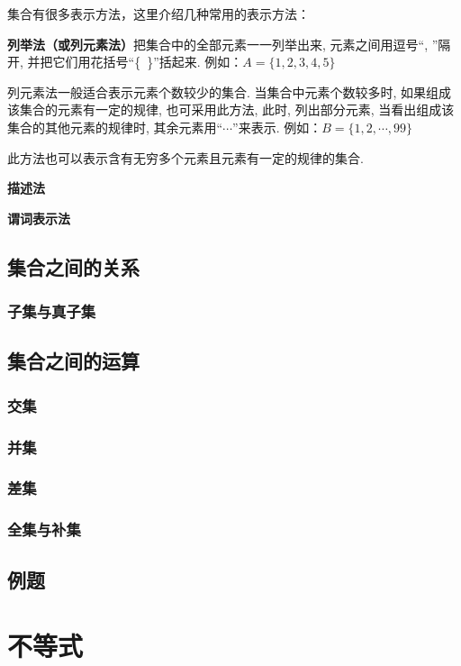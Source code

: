 \documentclass[a5paper]{article}
\begin{document}
集合有很多表示方法，这里介绍几种常用的表示方法：

\textbf{列举法（或列元素法）}把集合中的全部元素一一列举出来, 元素之间用逗号“, ”隔开, 并把它们用花括号“\{~\}”括起来. 例如：$A=\{1,2,3,4,5\}$

列元素法一般适合表示元素个数较少的集合. 当集合中元素个数较多时, 如果组成该集合的元素有一定的规律, 也可采用此方法, 此时, 列出部分元素, 当看出组成该集合的其他元素的规律时, 其余元素用“$\cdots$”来表示. 例如：$B=\{1,2,\cdots{},99\}$

此方法也可以表示含有无穷多个元素且元素有一定的规律的集合.

\textbf{描述法}

\textbf{谓词表示法}

\subsection{集合之间的关系}

\subsubsection{子集与真子集}

\subsection{集合之间的运算}

\subsubsection{交集}

\subsubsection{并集}

\subsubsection{差集}

\subsubsection{全集与补集}

\subsection{例题}

\section{不等式}
\end{document}
